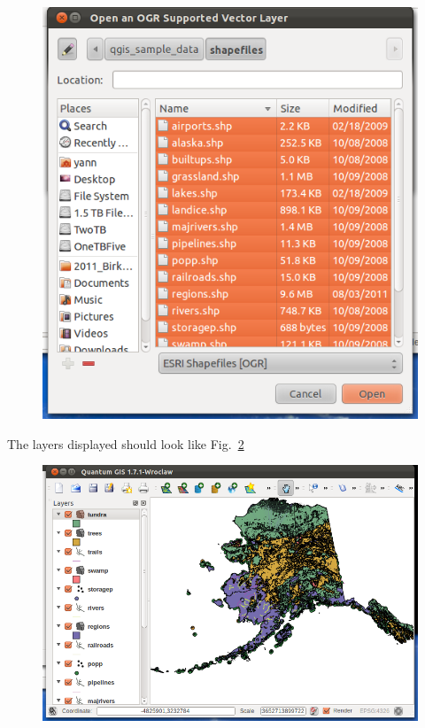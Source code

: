 \begin{figure}[htbp]
   \centering
   \includegraphics[scale=0.35]{qgis002.png}
   \caption{}
   \label{fig:qgis002}
\end{figure}

The layers displayed should look like Fig.~\ref{fig:qgis003}

\begin{figure}[htbp]
   \centering
   \includegraphics[scale=0.35]{qgis003.png}
   \caption{}
   \label{fig:qgis003}
\end{figure}

